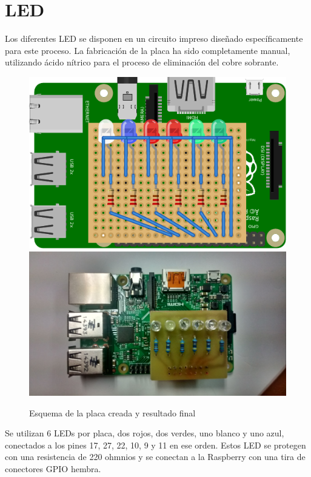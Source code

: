 \documentclass{article}
\begin{document}
\section{LED}

Los diferentes LED se disponen en un circuito impreso diseñado específicamente para este proceso. La fabricación de la placa ha sido completamente manual, utilizando ácido nítrico para el proceso de eliminación del cobre sobrante.

\begin{figure}[H]
\centering
\includegraphics[height=0.2\textheight]{placabreadboard_bb}
\includegraphics[height=0.2\textheight]{led/general}
\caption{Esquema de la placa creada y resultado final}
\end{figure}

Se utilizan 6 LEDs por placa, dos rojos, dos verdes, uno blanco y uno azul, conectados a los pines 17, 27, 22, 10, 9 y 11 en ese orden. Estos LED se protegen con una resistencia de 220 ohmnios y se conectan a la Raspberry con una tira de conectores GPIO hembra.
\end{document}
